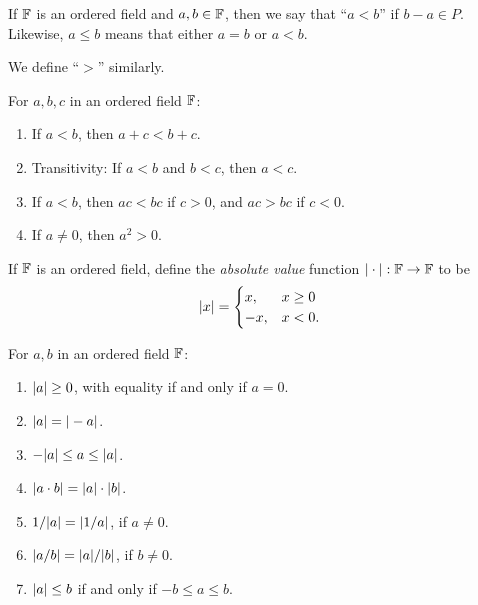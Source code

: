 \documentclass[11pt,twoside=off,numbers=noenddot]{scrbook}
\begin{document}
\begin{definition}[Inequalities]
    If $\mathbb F$ is an ordered field and $a, b \in \mathbb F$, then we say that ``$a < b$'' if $b - a \in P$. Likewise, $a \leq b$ means that either $a = b$ or $a < b$.

    We define ``$>$'' similarly.
\end{definition}

\begin{fact}
    For $a, b, c$ in an ordered field $\mathbb F$:
    \begin{enumerate}
        \item If $a < b$, then $a + c < b + c$.
        \item Transitivity: If $a < b$ and $b < c$, then $a < c$.
        \item If $a < b$, then $ac < bc$ if $c > 0$, and $ac > bc$ if $c < 0$.
        \item If $a \neq 0$, then $a^2 > 0$.
    \end{enumerate}
\end{fact}

\begin{definition}
    If $\mathbb F$ is an ordered field, define the \textit{absolute value} function $| \cdot | : \mathbb F \to \mathbb F$ to be
    \begin{align*}
        | x | = \begin{cases}
            x, & x \geq 0 \\
            -x, & x < 0.
        \end{cases}
    \end{align*}
\end{definition}

\begin{fact}
    For $a, b$ in an ordered field $\mathbb F$:
    \begin{enumerate}
        \item $| a | \geq 0$, with equality if and only if $a = 0$.
        \item $| a | = | -a |$.
        \item $-| a | \leq a \leq | a |$.
        \item $| a \cdot b | = | a | \cdot | b |$.
        \item $1/| a | = | 1/a |$, if $a \neq 0$.
        \item $| a/b | = | a |/| b |$, if $b \neq 0$.
        \item $| a | \leq b$ if and only if $-b \leq a \leq b$.
    \end{enumerate}
\end{fact}
\end{document}
